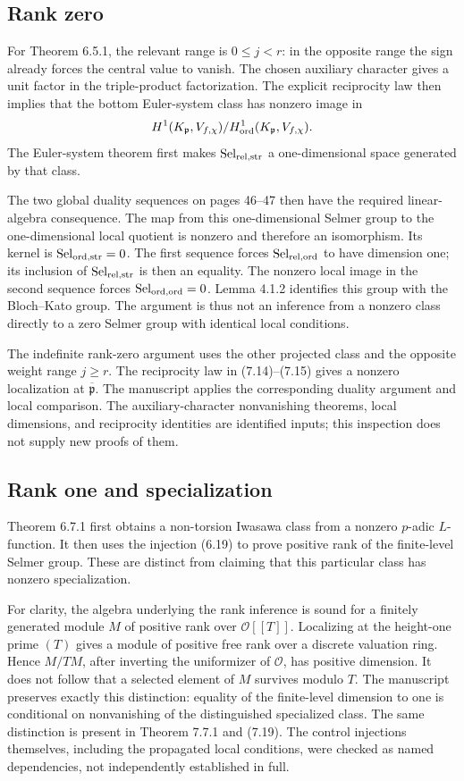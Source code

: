 \documentclass[10pt]{article}
\begin{document}
\subsection*{Rank zero}
For Theorem 6.5.1, the relevant range is \(0\leq j<r\): in the opposite range the sign already forces the central value to vanish. The chosen auxiliary character gives a unit factor in the triple-product factorization. The explicit reciprocity law then implies that the bottom Euler-system class has nonzero image in \[H^1(K_{\mathfrak p},V_{f,\chi})/
H^1_{\rm ord}(K_{\mathfrak p},V_{f,\chi}).\] The Euler-system theorem first makes \(\operatorname{Sel}_{\rm rel,str}\) a one-dimensional space generated by that class.\par
The two global duality sequences on pages 46–47 then have the required linear-algebra consequence. The map from this one-dimensional Selmer group to the one-dimensional local quotient is nonzero and therefore an isomorphism. Its kernel is \(\operatorname{Sel}_{\rm ord,str}=0\). The first sequence forces \(\operatorname{Sel}_{\rm rel,ord}\) to have dimension one; its inclusion of \(\operatorname{Sel}_{\rm rel,str}\) is then an equality. The nonzero local image in the second sequence forces \(\operatorname{Sel}_{\rm ord,ord}=0\). Lemma 4.1.2 identifies this group with the Bloch–Kato group. The argument is thus not an inference from a nonzero class directly to a zero Selmer group with identical local conditions.\par
The indefinite rank-zero argument uses the other projected class and the opposite weight range \(j\geq r\). The reciprocity law in (7.14)–(7.15) gives a nonzero localization at \(\overline{\mathfrak p}\). The manuscript applies the corresponding duality argument and local comparison. The auxiliary-character nonvanishing theorems, local dimensions, and reciprocity identities are identified inputs; this inspection does not supply new proofs of them.\par
\subsection*{Rank one and specialization}
Theorem 6.7.1 first obtains a non-torsion Iwasawa class from a nonzero \(p\)-adic \(L\)-function. It then uses the injection (6.19) to prove positive rank of the finite-level Selmer group. These are distinct from claiming that this particular class has nonzero specialization.\par
For clarity, the algebra underlying the rank inference is sound for a finitely generated module \(M\) of positive rank over \(\mathcal O[[T]]\). Localizing at the height-one prime \((T)\) gives a module of positive free rank over a discrete valuation ring. Hence \(M/TM\), after inverting the uniformizer of \(\mathcal O\), has positive dimension. It does not follow that a selected element of \(M\) survives modulo \(T\). The manuscript preserves exactly this distinction: equality of the finite-level dimension to one is conditional on nonvanishing of the distinguished specialized class. The same distinction is present in Theorem 7.7.1 and (7.19). The control injections themselves, including the propagated local conditions, were checked as named dependencies, not independently established in full.\par
\end{document}
